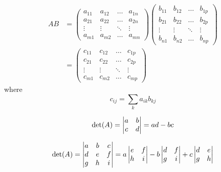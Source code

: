 \documentclass[fleqn,oneside]{article}
\begin{document}
\begin{align*}
	AB &= \left(\begin{array}{cccc}
		a_{11}  &  a_{12} & \ldots  & a_{1n} \\
		a_{21} & a_{22}   & \ldots  & a_{2n} \\
		\vdots &  \vdots   & \ddots  & \vdots \\
		a_{m1}  & a_{m2} & \ldots  & a_{mn} 
	\end{array}\right)
	\left(\begin{array}{cccc}
		b_{11}  & b_{12} & \ldots  & b_{1p} \\
		b_{21} & b_{22}   & \ldots  & b_{2p} \\
		\vdots &  \vdots   & \ddots  & \vdots \\
		b_{n1}  & b_{n2} & \ldots  & b_{np} 
	\end{array}\right)
	\\
	&=
	\left(\begin{array}{cccc}
		c_{11}  & c_{12} & \ldots  & c_{1p} \\
		c_{21} & c_{22}   & \ldots  & c_{2p} \\
		\vdots &  \vdots   & \ddots  & \vdots \\
		c_{m1}  & c_{m2} & \ldots  & c_{mp} 
	\end{array}\right)
\end{align*}
where
\begin{equation*}c_{ij} = \sum_{k} a_{ik}b_{kj}\end{equation*}

\begin{equation*} 
\det(A) = \left| \begin{matrix}a & b \cr c & d \end{matrix} \right| = ad - bc
\end{equation*}

\begin{equation*} 
	\det(A) = \left| \begin{matrix}a & b & c \cr d & e & f \cr g & h & i \end{matrix} \right| = a \left| \begin{matrix} e & f \cr h & i \end{matrix} \right| - b \left| \begin{matrix} d & f \cr g & i  \end{matrix} \right|  +c \left| \begin{matrix} d & e \cr g & h  \end{matrix} \right| 
\end{equation*}
	
	
	
	
	
\end{document}
